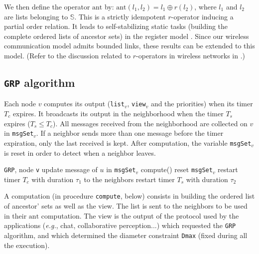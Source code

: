 \documentclass[11pt,english]{article}
\newcommand{\Latin}[1]{\textit{#1}}
\newcommand{\eg}{\Latin{e.g.},\xspace}
\begin{document}
We then define the operator $\mathrm{ant}$ by: $\mathrm{ant}(l_1, l_2) = l_1
\oplus r(l_2)$, where $l_1$ and $l_2$ are lists belonging to $\mathbb{S}$. This
is a strictly idempotent $r$-operator \cite{SSS07} inducing a partial order
relation. It leads to self-stabilizing static tasks (building the complete
ordered lists of ancestor sets) in the register model \cite{DT03}.
Since our wireless communication model admits bounded links, these results can
be extended to this model. (Refer to the discussion related to $r$-operators in
wireless networks in \cite{JACIC06}.)


\subsection{\texttt{GRP} algorithm}
 

Each node $v$ computes its output (\texttt{list}$_v$, \texttt{view}$_v$ and the
priorities) when its timer $T_c$ expires. It broadcasts its output in the
neighborhood when the timer $T_s$ expires ($T_s \leq T_c$).
All messages received from the neighborhood are collected on $v$ in
\texttt{msgSet}$_v$. If a neighbor sends more than one message before the timer
expiration, only the last received is kept.
After computation, the variable \texttt{msgSet}$_v$ is reset in order to detect
when a neighbor leaves.


\begin{footnotesize}
\begin{algorithm*}{\texttt{GRP}, node \texttt{v}}
  \I update message of $u$ in \texttt{msgSet}$_v$
\ENDACTION
{}
  \I compute()
  \I reset \texttt{msgSet}$_v$
  \I restart timer $T_c$ with duration $\tau_1$
\ENDACTION
{}
   to the neighbors \label{l:send}
  \I restart timer $T_s$ with duration $\tau_2$
\end{algorithm*}
\end{footnotesize}

A computation (in procedure \texttt{compute}, below) consists in building the
ordered list of ancestor' sets as well as the view. The list is sent to the
neighbors to be used in their $\mathrm{ant}$ computation. The view is the output
of the protocol used by the applications (\eg chat, collaborative perception...)
which requested the \texttt{GRP} algorithm, and which determined the diameter
constraint \texttt{Dmax} (fixed during all the execution).
\end{document}
